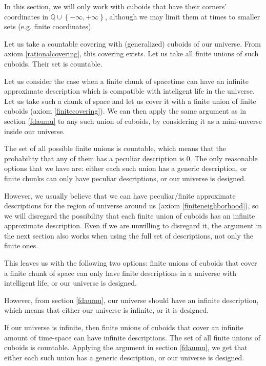 \documentclass[a4paper
,draft
]{article}
\def\rationale{\mathbb{Q}}
\newcommand{\multime}[1]{\left\{ #1 \right\}}
\begin{document}
In this section, we will only work with cuboids that have their
corners' coordinates
in $\rationale\cup\multime{-\infty, +\infty}$, although we may limit
them at times to smaller sets (e.g. finite coordinates).

Let us take a countable covering with (generalized) cuboids of our universe.
From axiom \ref{rationalcovering}, this covering exists.
Let us take all finite unions of such cuboids. Their set is countable.

Let us consider the case when a finite chunk of spacetime can
have an infinite approximate
description which is compatible with inteligent life in the universe.
Let us take such a chunk of space and let us cover it with a finite union of
finite cuboids (axiom \ref{finitecovering}).
We can then apply the same argument as in section \ref{fdaumu} to any
such union of cuboids, by considering it as a mini-unverse inside
our universe.

The set of all possible finite unions is countable,
which means that the probability that any of them has a peculiar
description is $0$. The only reasonable options that we have are:
either each such union has a generic description,
or finite chunks can only have peculiar descriptions, or our universe
is designed.

However, we usually believe that we can have peculiar/finite
approximate descriptions
for the region of universe around us (axiom \ref{finiteneighborhood}), so we
will disregard the possibility that each finite union of cuboids has an
infinite approximate description. Even if we are unwilling to disregard it,
the argument in the next section also works when using the full set of
descriptions, not only the finite ones.

This leaves us with the following
two options: finite unions of cuboids that cover a finite chunk of space can
only have finite descriptions in a universe with intelligent life, or our
universe is designed.

However, from section \ref{fdaumu}, our universe should have an
infinite description, which means that either our universe is infinite,
or it is designed.

If our universe is infinite,
then finite unions of cuboids that cover an infinite
amount of time-space can have infinite descriptions. The set of all finite
unions of cuboids is countable.
Applying the argument
in section \ref{fdaumu}, we get that either each such union has a generic
description, or our universe is designed.
\end{document}
